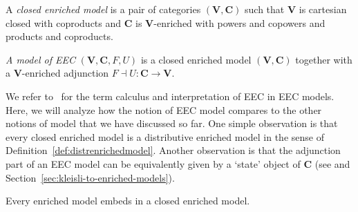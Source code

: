\documentclass{LMCS}
\newcommand{\hide}[1]{}
\newcommand{\VCat}{\fixedcatfont{V}} \newcommand{\CCat}{\fixedcatfont{C}} \newcommand{\DCat}{\fixedcatfont{D}}
\newcommand{\fixedcatfont}{\mathbf}
\begin{document}
\begin{defi}
\label{def:eecmodel}
  A \emph{closed enriched model}
  is a pair of categories 
  $(\VCat,\CCat)$ 
  such that $\VCat$ is cartesian closed 
  with coproducts
  and $\CCat$ is $\VCat$-enriched with 
  powers and copowers and products and coproducts.

  \emph{A model of EEC} $(\VCat,\CCat,F,U)$ \cite{Mogelberg:CSL:09}
  is 
  a closed enriched model
  $(\VCat,\CCat)$ 
  together with a
  $\VCat$-enriched adjunction $F\dashv U\colon \CCat\to\VCat$.
\end{defi}
We refer to~\cite{Mogelberg:CSL:09} 
for the term calculus and interpretation of EEC in EEC models. 
Here, we will 
analyze how the notion of EEC model compares to
the other notions of model that we have discussed so far.
One simple observation is that 
every closed enriched model 
is a distributive enriched model
in the sense of Definition~\ref{def:distrenrichedmodel}.
Another observation is
that
the adjunction part of an EEC model can be 
equivalently given by a `state' object of $\CCat$
(see \cite[Proof of Thm.~4]{Mogelberg:CSL:09} and 
Section~\ref{sec:kleisli-to-enriched-models}).
\hide{the enriched adjunction $F\vdash U$ is uniquely 
determined by the state object $F(1)$ in $\CCat$ 
(Proposition~\ref{prop:adjmodels}). }
\begin{thm} 
\label{thm:embedding:ECBV:EEC}
Every enriched model 
embeds in a closed enriched model.
\end{thm}
\newcommand{\Pshf}[1]{\widehat{#1}}\newcommand{\yoneda}{\mathbf{y}}\newcommand{\WeakMonoid}{\mathcal M}
\end{document}
